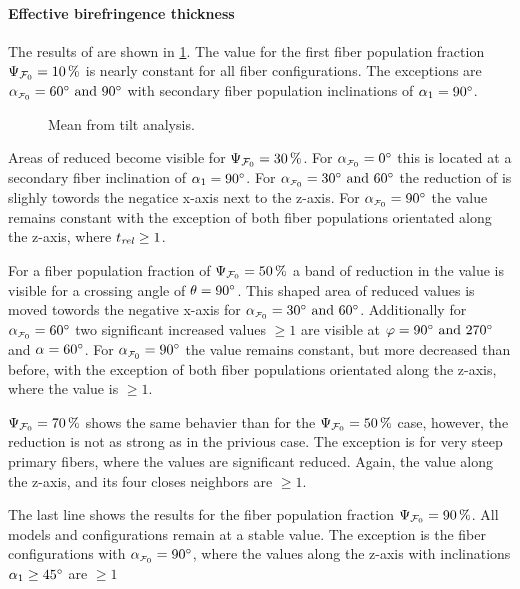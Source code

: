 \paragraph{Effective birefringence thickness \trel{}}
% 
The results of \trel{} are shown in \cref{fig:sim_ana_trel}.
The \trel{} value for the first fiber population fraction $\textnormal{$\Psi_{\textnormal{$\mathcal{F}_0$}}$}=\SI{10}{\percent}$ 
is nearly constant for all fiber configurations.
The exceptions are $\modelInc=\SIlist{60;90}{\degree}$ with secondary fiber population inclinations of $\textnormal{$\alpha$}_1 = \SI{90}{\degree}$.
\par
%
\begin{figure}[!p]
    \centering
    \tikzset{external/export next=false}
    \caption{Mean \trel{} from tilt analysis.}
    \label{fig:sim_ana_trel}
\end{figure}
% 
Areas of reduced \trel{} become visible for $\textnormal{$\Psi_{\textnormal{$\mathcal{F}_0$}}$}=\SI{30}{\percent}$.
For $\modelInc=\SI{0}{\degree}$ this is located at a secondary fiber inclination of $\textnormal{$\alpha$}_1 = \SI{90}{\degree}$.
For $\modelInc=\SIlist[]{30;60}{\degree}$ the reduction of \trel{} is slighly towords the negatice x-axis next to the z-axis.
For $\modelInc=\SI{90}{\degree}$ the \trel{} value remains constant with the exception of both fiber populations orientated along the z-axis, where $\textnormal{$t_\mathit{rel}$} \geq 1$.
\par
% 
For a fiber population fraction of $\textnormal{$\Psi_{\textnormal{$\mathcal{F}_0$}}$}=\SI{50}{\percent}$ a band of reduction in the \trel{} value is visible for a crossing angle of $\textnormal{$\theta$}=\SI{90}{\degree}$.
This  shaped area of reduced \trel{} values is moved towords the negative x-axis for $\modelInc=\SIlist{30;60}{\degree}$.
Additionally for $\modelInc=\SI{60}{\degree}$ two significant increased \trel{} values $\geq 1$ are visible at $\dir=\SIlist{90;270}{\degree}$ and $\textnormal{$\alpha$}=\SI{60}{\degree}$.
For $\modelInc=\SI{90}{\degree}$ the \trel{} value remains constant, but more decreased than before, with the exception of both fiber populations orientated along the z-axis, where the \trel{} value is $\geq 1$.
\par
% 
$\textnormal{$\Psi_{\textnormal{$\mathcal{F}_0$}}$}=\SI{70}{\percent}$ shows the same behavier than for the $\textnormal{$\Psi_{\textnormal{$\mathcal{F}_0$}}$}=\SI{50}{\percent}$ case, however, the reduction is not as strong as in the privious case.
The exception is for very steep primary fibers, where the \trel{} values are significant reduced.
Again, the \trel{} value along the z-axis, and its four closes neighbors are $\geq 1$. 
\par
% 
The last line shows the results for the fiber population fraction $\textnormal{$\Psi_{\textnormal{$\mathcal{F}_0$}}$}=\SI{90}{\percent}$.
All models and configurations remain at a stable \trel{} value.
The exception is the fiber configurations with $\modelInc=\SI{90}{\degree}$, where the \trel{} values along the z-axis with inclinations $\textnormal{$\alpha$}_1 \geq \SI{45}{\degree}$ are $\geq \SI{1}{}$
% 
% 
%
